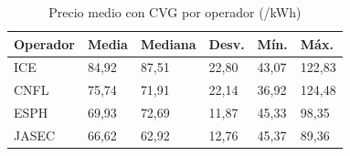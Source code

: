 \begin{table}[htbp]
\caption{Precio medio con CVG por operador (\crc/kWh)}
\label{tab:desc-operador}
\centering
\scriptsize
\renewcommand{\arraystretch}{1.15}
\begin{tabular}{@{}p{1.2cm} p{0.8cm} p{0.9cm} p{1.1cm} p{0.8cm} p{0.8cm}@{}}
\hline
\textbf{Operador} & \textbf{Media} & \textbf{Mediana} & \textbf{Desv.} & \textbf{M\'in.} & \textbf{M\'ax.} \\
\hline
ICE & 84,92 & 87,51 & 22,80 & 43,07 & 122,83 \\
CNFL & 75,74 & 71,91 & 22,14 & 36,92 & 124,48 \\
ESPH & 69,93 & 72,69 & 11,87 & 45,33 & 98,35 \\
JASEC & 66,62 & 62,92 & 12,76 & 45,37 & 89,36 \\
\hline
\end{tabular}
\end{table}
\FloatBarrier

